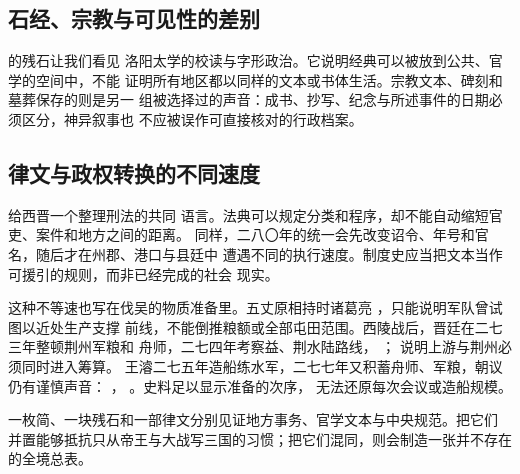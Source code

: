 \subsection{石经、宗教与可见性的差别}

的残石让我们看见
洛阳太学的校读与字形政治。它说明经典可以被放到公共、官学的空间中，不能
证明所有地区都以同样的文本或书体生活。宗教文本、碑刻和墓葬保存的则是另一
组被选择过的声音：成书、抄写、纪念与所述事件的日期必须区分，神异叙事也
不应被误作可直接核对的行政档案。

\subsection{律文与政权转换的不同速度}

给西晋一个整理刑法的共同
语言。法典可以规定分类和程序，却不能自动缩短官吏、案件和地方之间的距离。
同样，二八〇年的统一会先改变诏令、年号和官名，随后才在州郡、港口与县廷中
遭遇不同的执行速度。制度史应当把文本当作可援引的规则，而非已经完成的社会
现实。

这种不等速也写在伐吴的物质准备里。五丈原相持时诸葛亮
，只能说明军队曾试图以近处生产支撑
前线，不能倒推粮额或全部屯田范围。西陵战后，晋廷在二七三年整顿荆州军粮和
舟师，二七四年考察益、荆水陆路线，
；
说明上游与荆州必须同时进入筹算。
王濬二七五年造船练水军，二七七年又积蓄舟师、军粮，朝议仍有谨慎声音：
，
。史料足以显示准备的次序，
无法还原每次会议或造船规模。

\begin{turningpoint}[材料的尺度]
一枚简、一块残石和一部律文分别见证地方事务、官学文本与中央规范。把它们
并置能够抵抗只从帝王与大战写三国的习惯；把它们混同，则会制造一张并不存在
的全境总表。
\end{turningpoint}
